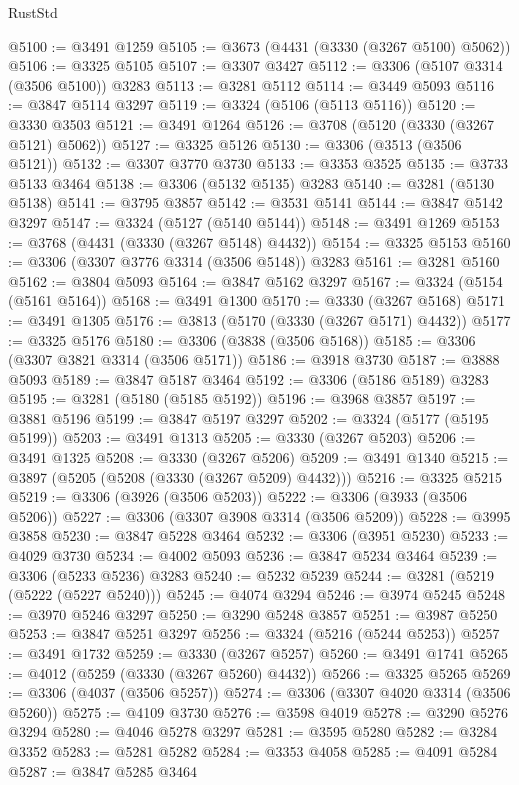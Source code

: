 \begin{lexlean}{RustStd}
\begin{coremodule}
@5100 := @3491 @1259
@5105 := @3673 (@4431 (@3330 (@3267 @5100) @5062))
@5106 := @3325 @5105
@5107 := @3307 @3427
@5112 := @3306 (@5107 @3314 (@3506 @5100)) @3283
@5113 := @3281 @5112
@5114 := @3449 @5093
@5116 := @3847 @5114 @3297
@5119 := @3324 (@5106 (@5113 @5116))
@5120 := @3330 @3503
@5121 := @3491 @1264
@5126 := @3708 (@5120 (@3330 (@3267 @5121) @5062))
@5127 := @3325 @5126
@5130 := @3306 (@3513 (@3506 @5121))
@5132 := @3307 @3770 @3730
@5133 := @3353 @3525
@5135 := @3733 @5133 @3464
@5138 := @3306 (@5132 @5135) @3283
@5140 := @3281 (@5130 @5138)
@5141 := @3795 @3857
@5142 := @3531 @5141
@5144 := @3847 @5142 @3297
@5147 := @3324 (@5127 (@5140 @5144))
@5148 := @3491 @1269
@5153 := @3768 (@4431 (@3330 (@3267 @5148) @4432))
@5154 := @3325 @5153
@5160 := @3306 (@3307 @3776 @3314 (@3506 @5148)) @3283
@5161 := @3281 @5160
@5162 := @3804 @5093
@5164 := @3847 @5162 @3297
@5167 := @3324 (@5154 (@5161 @5164))
@5168 := @3491 @1300
@5170 := @3330 (@3267 @5168)
@5171 := @3491 @1305
@5176 := @3813 (@5170 (@3330 (@3267 @5171) @4432))
@5177 := @3325 @5176
@5180 := @3306 (@3838 (@3506 @5168))
@5185 := @3306 (@3307 @3821 @3314 (@3506 @5171))
@5186 := @3918 @3730
@5187 := @3888 @5093
@5189 := @3847 @5187 @3464
@5192 := @3306 (@5186 @5189) @3283
@5195 := @3281 (@5180 (@5185 @5192))
@5196 := @3968 @3857
@5197 := @3881 @5196
@5199 := @3847 @5197 @3297
@5202 := @3324 (@5177 (@5195 @5199))
@5203 := @3491 @1313
@5205 := @3330 (@3267 @5203)
@5206 := @3491 @1325
@5208 := @3330 (@3267 @5206)
@5209 := @3491 @1340
@5215 := @3897 (@5205 (@5208 (@3330 (@3267 @5209) @4432)))
@5216 := @3325 @5215
@5219 := @3306 (@3926 (@3506 @5203))
@5222 := @3306 (@3933 (@3506 @5206))
@5227 := @3306 (@3307 @3908 @3314 (@3506 @5209))
@5228 := @3995 @3858
@5230 := @3847 @5228 @3464
@5232 := @3306 (@3951 @5230)
@5233 := @4029 @3730
@5234 := @4002 @5093
@5236 := @3847 @5234 @3464
@5239 := @3306 (@5233 @5236) @3283
@5240 := @5232 @5239
@5244 := @3281 (@5219 (@5222 (@5227 @5240)))
@5245 := @4074 @3294
@5246 := @3974 @5245
@5248 := @3970 @5246 @3297
@5250 := @3290 @5248 @3857
@5251 := @3987 @5250
@5253 := @3847 @5251 @3297
@5256 := @3324 (@5216 (@5244 @5253))
@5257 := @3491 @1732
@5259 := @3330 (@3267 @5257)
@5260 := @3491 @1741
@5265 := @4012 (@5259 (@3330 (@3267 @5260) @4432))
@5266 := @3325 @5265
@5269 := @3306 (@4037 (@3506 @5257))
@5274 := @3306 (@3307 @4020 @3314 (@3506 @5260))
@5275 := @4109 @3730
@5276 := @3598 @4019
@5278 := @3290 @5276 @3294
@5280 := @4046 @5278 @3297
@5281 := @3595 @5280
@5282 := @3284 @3352
@5283 := @5281 @5282
@5284 := @3353 @4058
@5285 := @4091 @5284
@5287 := @3847 @5285 @3464

\end{coremodule}
\end{lexlean}
